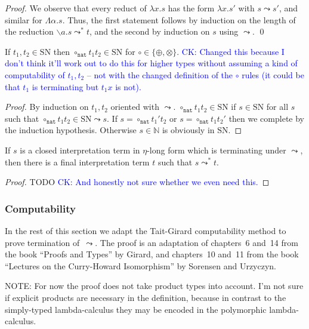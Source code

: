 \documentclass[runningheads,a4paper]{llncs}
\newcommand{\abs}[2]{\lambda #1.#2}
\newcommand{\tabs}[2]{\Lambda #1.#2}
\newcommand{\abstraction}[2]{\backslash #1.#2}
\newcommand{\nat}{\mathtt{nat}}
\newcommand{\SN}{\mathrm{SN}}
\newcommand{\CK}[1]{\textcolor{blue}{CK: #1}}
\begin{document}
\begin{proof}
We observe that every reduct of $\abs{x}{s}$ has the form $\abs{x}{s'}$
with $s \leadsto s'$, and similar for $\tabs{\alpha}{s}$.
Thus, the first statement follows by induction on the length of the
reduction $\abstraction{a}{s} \leadsto^* t$, and the second by induction
on $s$ using $\leadsto$.
\qed
\end{proof}

\begin{lemma}\label{lem_circ_sn_base}
  If $t_1,t_2 \in \SN$ then $\circ_\nat t_1 t_2 \in \SN$ for
  $\circ \in \{\oplus,\otimes\}$.
  \CK{Changed this because I don't think it'll work out to do this for
  higher types without assuming a kind of computability of $t_1,t_2$ --
  not with the changed definition of the $\circ$ rules (it could be
  that $t_1$ is terminating but $t_1 x$ is not).}
\end{lemma}

\begin{proof}
  By induction on $t_1,t_2$ oriented with $\leadsto$.
  $\circ_\nat t_1 t_2 \in \SN$ if $s \in \SN$ for all $s$ such that
  $\circ_\nat t_1 t_2 \in \SN \leadsto s$.
  If $s = \circ_\nat t_1' t_2$ or $s = \circ_\nat t_1 t_2'$ then we
  complete by the induction hypothesis.  Otherwise $s \in \mathbb{N}$ is
  obviously in $\SN$.
\end{proof}

\begin{lemma}
If $s$ is a closed interpretation term in $\eta$-long form which is
terminating under $\leadsto$, then there is a final interpretation term
$t$ such that $s \leadsto^* t$.
\end{lemma}

\begin{proof}
TODO
\CK{And honestly not sure whether we even need this.}
\end{proof}

\subsubsection{Computability}
In the rest of this section we adapt the Tait-Girard computability
method to prove termination of~$\leadsto$. The proof is an adaptation
of chapters~6 and~14 from the book ``Proofs and Types'' by Girard, and
chapters~10 and~11 from the book ``Lectures on the Curry-Howard
Isomorphism'' by Sorensen and Urzyczyn.

NOTE: For now the proof does not take product types into account. I'm
not sure if explicit products are necessary in the definition, because
in contrast to the simply-typed lambda-calculus they may be encoded in
the polymorphic lambda-calculus.
\end{document}
